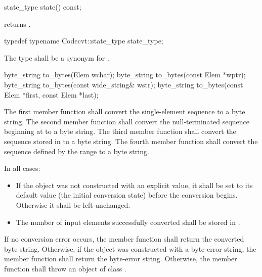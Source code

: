 %
%
\begin{itemdecl}
state_type state() const;
\end{itemdecl}

\begin{itemdescr}
\pnum
returns .
\end{itemdescr}

%
%
\begin{itemdecl}
typedef typename Codecvt::state_type state_type;
\end{itemdecl}

\begin{itemdescr}
\pnum
The type shall be a synonym for .
\end{itemdescr}

%
%
\begin{itemdecl}
byte_string to_bytes(Elem wchar);
byte_string to_bytes(const Elem *wptr);
byte_string to_bytes(const wide_string& wstr);
byte_string to_bytes(const Elem *first, const Elem *last);
\end{itemdecl}

\begin{itemdescr}
\pnum
\effects
The first member function shall convert the single-element sequence  to a byte string.
The second member function shall convert the null-terminated sequence beginning at  to
a byte string. The third member function shall convert the sequence stored in  to a
byte string. The fourth member function shall convert the sequence defined by the
range  to a byte string.

\pnum
In all cases:

\begin{itemize}
\item If the  object was not constructed with an explicit value, it
shall be
set to its default value (the initial conversion state) before the
conversion begins. Otherwise it shall be left unchanged.
\item The number of input elements successfully converted shall be stored
in .
\end{itemize}

\pnum
\returns
If no conversion error occurs, the member function shall return the converted byte string.
Otherwise, if the object was constructed with a byte-error string, the
member function shall return the byte-error string.
Otherwise, the member function shall throw an object of class .
\end{itemdescr}

